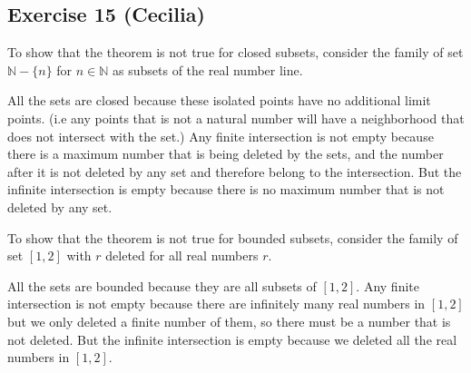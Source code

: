 \subsection*{Exercise 15 (Cecilia)}
To show that the theorem is not true for closed subsets, consider the family of set $ \mathbb{N} - \{n\} $ for $ n \in \mathbb{N} $ as subsets of the real number line.

All the sets are closed because these isolated points have no additional limit points. (i.e any points that is not a natural number will have a neighborhood that does not intersect with the set.)
Any finite intersection is not empty because there is a maximum number that is being deleted by the sets, and the number after it is not deleted by any set and therefore belong to the intersection.
But the infinite intersection is empty because there is no maximum number that is not deleted by any set.

To show that the theorem is not true for bounded subsets, consider the family of set $ [1, 2] $ with $ r $ deleted for all real numbers $ r $.

All the sets are bounded because they are all subsets of $ [1, 2] $.
Any finite intersection is not empty because there are infinitely many real numbers in $ [1, 2] $ but we only deleted a finite number of them, so there must be a number that is not deleted.
But the infinite intersection is empty because we deleted all the real numbers in $ [1, 2] $.

